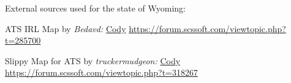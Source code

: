 













\vspace{2em}\footnoterule
{\footnotesize \noindent External sources used for the state of Wyoming:
\begin{description}[
	style=nextline,
	leftmargin=1.1em,
	labelsep=0pt,
	parsep=0pt,
	font=\normalfont,
]

\item[$\ast$]
ATS IRL Map by \textit{Bedavd:}
\hyperref[city:Cody]{Cody}
\url{https://forum.scssoft.com/viewtopic.php?t=285700}

\item[$\dagger$]
Slippy Map for ATS by \textit{truckermudgeon:}
\hyperref[city:Cody]{Cody}
\url{https://forum.scssoft.com/viewtopic.php?t=318267}

\end{description}
}
